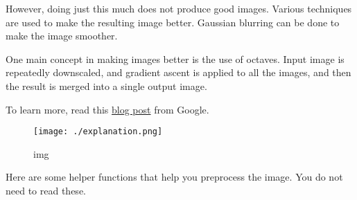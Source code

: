 \documentclass[11pt]{article}
\makeatletter
\def\maxwidth{\ifdim\Gin@nat@width>\linewidth\linewidth
    \else\Gin@nat@width\fi}
\let\Oldincludegraphics\includegraphics
\renewcommand{\includegraphics}[1]{\Oldincludegraphics[width=.8\maxwidth]{#1}}
\makeatother
\begin{document}
However, doing just this much does not produce good images. Various
techniques are used to make the resulting image better. Gaussian
blurring can be done to make the image smoother.

One main concept in making images better is the use of octaves. Input
image is repeatedly downscaled, and gradient ascent is applied to all
the images, and then the result is merged into a single output image.

To learn more, read this
\href{https://ai.googleblog.com/2015/06/inceptionism-going-deeper-into-neural.html}{blog
post} from Google.

\begin{figure}
\centering
\texttt{[image: ./explanation.png]}
\caption{img}
\end{figure}

    Here are some helper functions that help you preprocess the image. You
do not need to read these.
\end{document}
